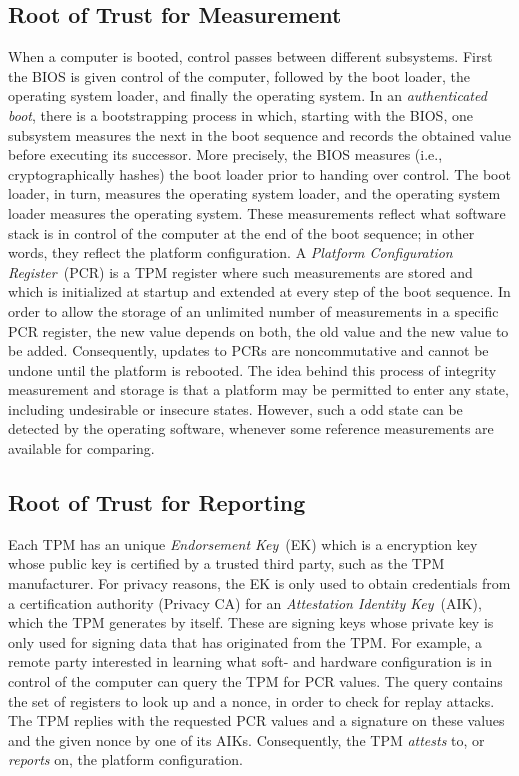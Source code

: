 \documentclass[runningheads]{llncs}
\begin{document}
\subsection{Root of Trust for Measurement}
When a computer is booted, control passes between different subsystems. First
the BIOS is given control of the computer, followed by the boot loader, the
operating system loader, and finally the operating system. In an
\emph{authenticated boot}, there is a bootstrapping process in which, starting
with the BIOS, one subsystem measures the next in the boot sequence and records
the obtained value before executing its successor. More precisely, the BIOS
measures (i.e., cryptographically hashes) the boot loader prior to handing
over control. The boot loader, in turn, measures the operating system loader,
and the operating system loader measures the operating system.
These measurements reflect what software stack is in control of the computer
at the end of the boot sequence; in other words, they reflect the platform
configuration. A \emph{Platform Configuration Register}~(PCR) is a TPM
register where such measurements are stored and which is initialized at
startup and extended at every step of the boot sequence. In order to allow
the storage of an unlimited number of measurements in a specific PCR register,
the new value depends on both, the old value and the new value to be added.
Consequently, updates to PCRs are noncommutative and cannot be undone until
the platform is rebooted. The idea behind this process of integrity measurement
and storage is that a platform may be permitted to enter any state, including
undesirable or insecure states. However, such a odd state can be detected
by the operating software, whenever some reference measurements are
available for comparing.

\subsection{Root of Trust for Reporting}
Each TPM has an unique \emph{Endorsement Key}~(EK) which is a encryption key
whose public key is certified by a trusted third party, such as the TPM
manufacturer. For privacy reasons, the EK is only used to obtain credentials
from a certification authority (Privacy CA) for an \emph{Attestation Identity
Key}~(AIK), which the TPM generates by itself.
These are signing keys whose private key is only used for signing data that
has originated from the TPM. For example, a remote party interested in
learning what soft- and hardware configuration is in control of the computer
can query the TPM for PCR values. The query contains the set of registers to
look up and a nonce, in order to check for replay attacks.
The TPM replies with the requested PCR values and a signature on these values
and the given nonce by one of its AIKs. Consequently, the TPM \emph{attests}
to, or \emph{reports} on, the platform configuration.
\end{document}
